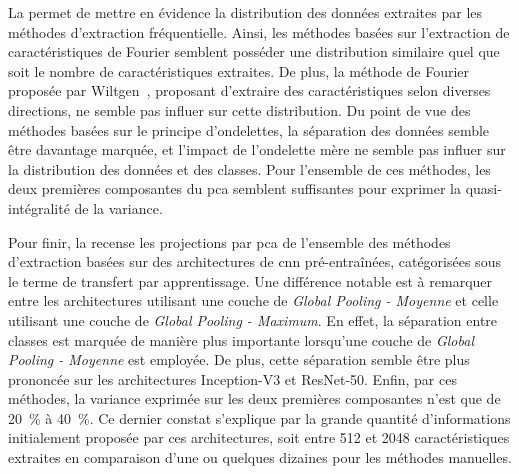 La  permet de mettre en évidence la distribution des données extraites par les méthodes d'extraction fréquentielle. Ainsi, les méthodes basées sur l'extraction de caractéristiques de Fourier semblent posséder une distribution similaire quel que soit le nombre de caractéristiques extraites. De plus, la méthode de Fourier proposée par Wiltgen~\cite{Wiltgen2008}, proposant d'extraire des caractéristiques selon diverses directions, ne semble pas influer sur cette distribution. Du point de vue des méthodes basées sur le principe d'ondelettes, la séparation des données semble être davantage marquée, et l'impact de l'ondelette mère ne semble pas influer sur la distribution des données et des classes. Pour l'ensemble de ces méthodes, les deux premières composantes du \gls{pca} semblent suffisantes pour exprimer la quasi-intégralité de la variance.\par

Pour finir, la  recense les projections par \gls{pca} de l'ensemble des méthodes d'extraction basées sur des architectures de \gls{cnn} pré-entraînées, catégorisées sous le terme de transfert par apprentissage. Une différence notable est à remarquer entre les architectures utilisant une couche de \textit{Global Pooling - Moyenne} et celle utilisant une couche de \textit{Global Pooling - Maximum}. En effet, la séparation entre classes est marquée de manière plus importante lorsqu'une couche de \textit{Global Pooling - Moyenne} est employée. De plus, cette séparation semble être plus prononcée sur les architectures Inception-V3 et ResNet-50. Enfin, par ces méthodes, la variance exprimée sur les deux premières composantes n'est que de 20~\% à 40~\%. Ce dernier constat s'explique par la grande quantité d'informations initialement proposée par ces architectures, soit entre 512 et 2048 caractéristiques extraites en comparaison d'une ou quelques dizaines pour les méthodes manuelles.\par

